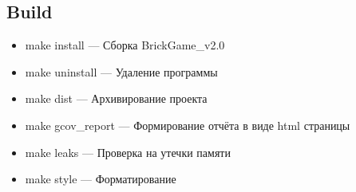 \documentclass{article}
\begin{document}
\subsection{Build}
\begin{itemize}
    \item make install — Сборка BrickGame_v2.0
    \item make uninstall — Удаление программы
    \item make dist — Архивирование проекта
    \item make gcov_report — Формирование отчёта в виде html страницы
    \item make leaks — Проверка на утечки памяти
    \item make style — Форматирование
\end{itemize}
\end{document}
